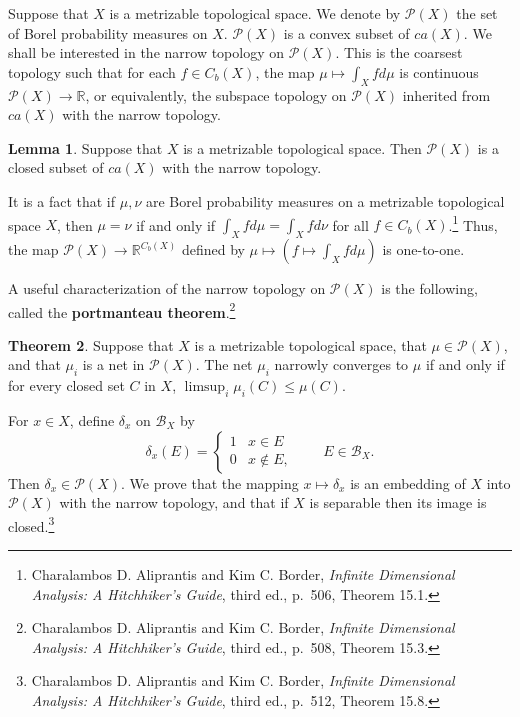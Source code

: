 \documentclass{article}
\theoremstyle{definition}
\newtheorem{theorem}{Theorem}
\newtheorem{lemma}[theorem]{Lemma}
\theoremstyle{definition}
\begin{document}
Suppose that $X$ is a metrizable topological space. We denote by $\mathscr{P}(X)$ the set of Borel probability measures on $X$.
$\mathscr{P}(X)$ is a convex subset of $ca(X)$.
We shall be interested in the narrow topology on $\mathscr{P}(X)$. This is  the coarsest topology such that for each $f \in C_b(X)$, the map
$\mu \mapsto \int_X f d\mu$ is continuous $\mathscr{P}(X) \to \mathbb{R}$, or equivalently, the subspace topology on $\mathscr{P}(X)$ inherited from $ca(X)$ with the narrow
topology. 

\begin{lemma}
Suppose that $X$ is a metrizable topological space. Then $\mathscr{P}(X)$ is a closed subset of $ca(X)$ with the narrow
topology.
\label{closedstar}
\end{lemma}

 It is a fact that if $\mu,\nu$ are Borel probability measures on a metrizable
topological space $X$, then $\mu=\nu$ if and only if $\int_X f d\mu = \int_X f d\nu$ for all $f \in C_b(X)$.\footnote{Charalambos D. 
Aliprantis and Kim C. Border, {\em Infinite Dimensional Analysis: A Hitchhiker's Guide}, third ed., p.~506, Theorem 15.1.}
Thus, the map $\mathscr{P}(X) \to \mathbb{R}^{C_b(X)}$ defined by $\mu \mapsto (f \mapsto \int_X f d\mu)$ is one-to-one.

A useful characterization of the narrow topology on $\mathscr{P}(X)$ is the following, called the \textbf{portmanteau theorem}.\footnote{Charalambos D. 
Aliprantis and Kim C. Border, {\em Infinite Dimensional Analysis: A Hitchhiker's Guide}, third ed., p.~508, Theorem 15.3.}

\begin{theorem}
Suppose that $X$ is a metrizable topological space, that $\mu \in \mathscr{P}(X)$, and that $\mu_i$ is a net in $\mathscr{P}(X)$. The net
$\mu_i$ narrowly  converges  to $\mu$ if and only
if for every closed set $C$ in $X$, $\limsup_i \mu_i(C) \leq \mu(C)$.
\label{153}
\end{theorem}

For $x \in X$, define $\delta_x$ on $\mathscr{B}_X$ by
\[
\delta_x(E) = \begin{cases}
1&x \in E\\
0&x \not \in E,
\end{cases}
\qquad E \in \mathscr{B}_X.
\]
Then $\delta_x \in \mathscr{P}(X)$. 
We  prove that the mapping $x \mapsto \delta_x$ is an embedding of $X$ into $\mathscr{P}(X)$ with the narrow topology,
and that if $X$ is separable then its image is closed.\footnote{Charalambos D. 
Aliprantis and Kim C. Border, {\em Infinite Dimensional Analysis: A Hitchhiker's Guide}, third ed., p.~512, Theorem 15.8.}
\end{document}
